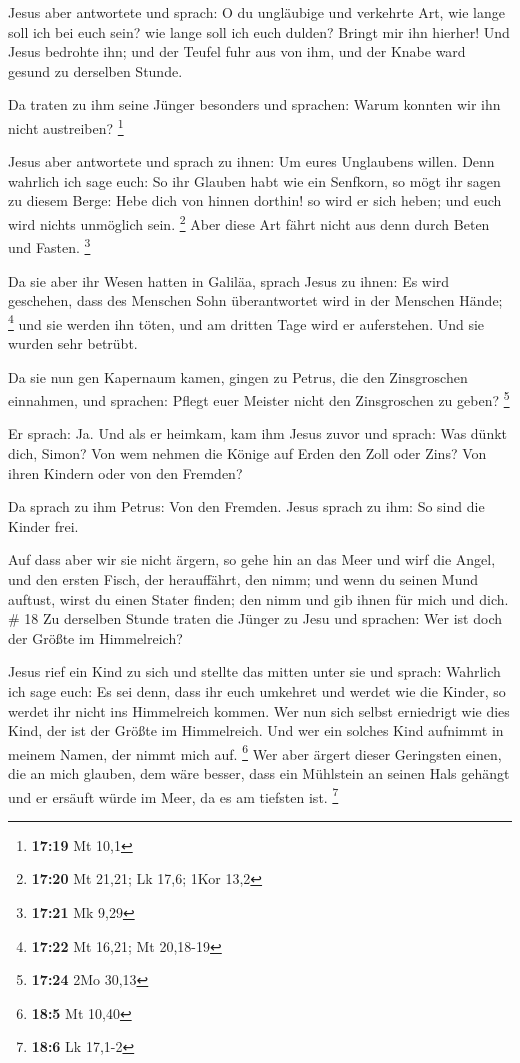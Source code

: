  Jesus aber antwortete und sprach: O du ungläubige und
verkehrte Art, wie lange soll ich bei euch sein? wie lange soll ich euch
dulden? Bringt mir ihn hierher!  Und Jesus bedrohte ihn;
und der Teufel fuhr aus von ihm, und der Knabe ward gesund zu derselben
Stunde.

 Da traten zu ihm seine Jünger besonders und sprachen:
Warum konnten wir ihn nicht austreiben? \footnote{\textbf{17:19} Mt 10,1}

 Jesus aber antwortete und sprach zu ihnen: Um eures
Unglaubens willen. Denn wahrlich ich sage euch: So ihr Glauben habt wie
ein Senfkorn, so mögt ihr sagen zu diesem Berge: Hebe dich von hinnen
dorthin! so wird er sich heben; und euch wird nichts unmöglich sein.
\footnote{\textbf{17:20} Mt 21,21; Lk 17,6; 1Kor 13,2} 
Aber diese Art fährt nicht aus denn durch Beten und Fasten. \footnote{\textbf{17:21}
  Mk 9,29}

 Da sie aber ihr Wesen hatten in Galiläa, sprach Jesus zu
ihnen: Es wird geschehen, dass des Menschen Sohn überantwortet wird in
der Menschen Hände; \footnote{\textbf{17:22} Mt 16,21; Mt 20,18-19}
 und sie werden ihn töten, und am dritten Tage wird er
auferstehen. Und sie wurden sehr betrübt.

 Da sie nun gen Kapernaum kamen, gingen zu Petrus, die
den Zinsgroschen einnahmen, und sprachen: Pflegt euer Meister nicht den
Zinsgroschen zu geben? \footnote{\textbf{17:24} 2Mo 30,13}

 Er sprach: Ja. Und als er heimkam, kam ihm Jesus zuvor
und sprach: Was dünkt dich, Simon? Von wem nehmen die Könige auf Erden
den Zoll oder Zins? Von ihren Kindern oder von den Fremden?

 Da sprach zu ihm Petrus: Von den Fremden. Jesus sprach
zu ihm: So sind die Kinder frei.

 Auf dass aber wir sie nicht ärgern, so gehe hin an das
Meer und wirf die Angel, und den ersten Fisch, der herauffährt, den
nimm; und wenn du seinen Mund auftust, wirst du einen Stater finden; den
nimm und gib ihnen für mich und dich. \# 18  Zu derselben
Stunde traten die Jünger zu Jesu und sprachen: Wer ist doch der Größte
im Himmelreich?

 Jesus rief ein Kind zu sich und stellte das mitten unter
sie  und sprach: Wahrlich ich sage euch: Es sei denn, dass
ihr euch umkehret und werdet wie die Kinder, so werdet ihr nicht ins
Himmelreich kommen.  Wer nun sich selbst erniedrigt wie
dies Kind, der ist der Größte im Himmelreich.  Und wer ein
solches Kind aufnimmt in meinem Namen, der nimmt mich auf. \footnote{\textbf{18:5}
  Mt 10,40}  Wer aber ärgert dieser Geringsten einen, die
an mich glauben, dem wäre besser, dass ein Mühlstein an seinen Hals
gehängt und er ersäuft würde im Meer, da es am tiefsten ist. \footnote{\textbf{18:6}
  Lk 17,1-2}

